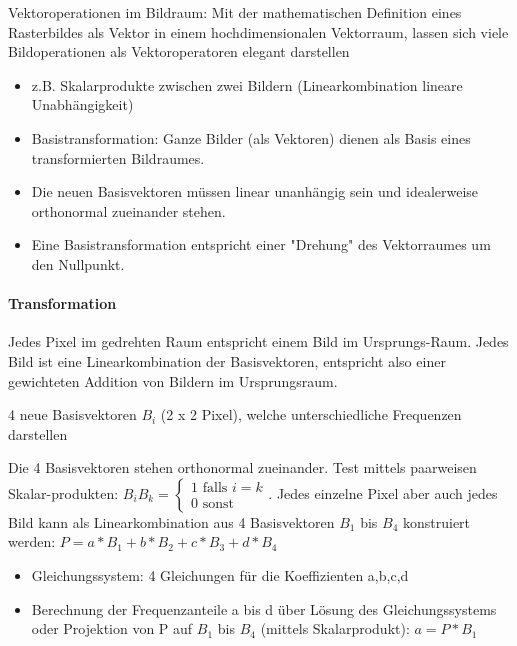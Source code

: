 \documentclass[10pt,landscape]{article}
\begin{document}
\begin{multicols}{3}

Vektoroperationen im Bildraum: Mit der mathematischen Definition eines Rasterbildes als Vektor in einem hochdimensionalen Vektorraum, lassen sich viele Bildoperationen als Vektoroperatoren elegant darstellen
\begin{itemize}
\item z.B. Skalarprodukte zwischen zwei Bildern (Linearkombination lineare Unabhängigkeit)
\item Basistransformation: Ganze Bilder (als Vektoren) dienen als Basis eines transformierten Bildraumes.
\item Die neuen Basisvektoren müssen linear unanhängig sein und idealerweise orthonormal zueinander stehen.
\item Eine Basistransformation entspricht einer "Drehung" des Vektorraumes um den Nullpunkt.
\end{itemize}

\paragraph{Transformation}
Jedes Pixel im gedrehten Raum entspricht einem Bild im Ursprungs-Raum.
Jedes Bild ist eine Linearkombination der Basisvektoren, entspricht also einer gewichteten Addition von Bildern im Ursprungsraum.


4 neue Basisvektoren $B_i$ (2 x 2 Pixel), welche unterschiedliche Frequenzen darstellen


Die 4 Basisvektoren stehen orthonormal zueinander. Test mittels paarweisen Skalar-produkten: $B_iB_k=\begin{cases}1 \text{ falls } i=k\\ 0 \text{ sonst }\end{cases}$.
Jedes einzelne Pixel aber auch jedes Bild kann als Linearkombination aus 4 Basisvektoren $B_1$ bis $B_4$ konstruiert werden: $P=a*B_1+b*B_2+c*B_3+d*B_4$
\begin{itemize}
  \item Gleichungssystem: 4 Gleichungen für die Koeffizienten a,b,c,d
  \item Berechnung der Frequenzanteile a bis d über Lösung des Gleichungssystems oder Projektion von P auf $B_1$ bis $B_4$ (mittels Skalarprodukt): $a=P*B_1$
\end{itemize}


\end{multicols}
\end{document}
